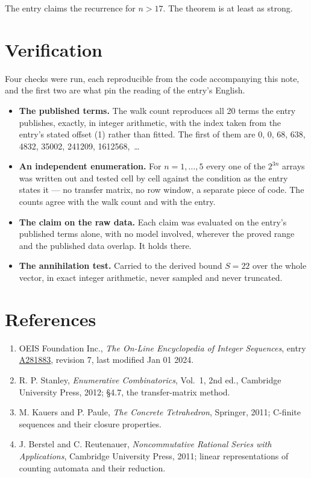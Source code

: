 \documentclass[11pt]{article}
\theoremstyle{definition}
\begin{document}
The entry claims the recurrence for $n > 17$. The theorem is at least as strong.

\section{Verification}

Four checks were run, each reproducible from the code accompanying this note, and the first two are what pin the reading of the entry's English.

\begin{itemize}

\item {\bfseries The published terms.} The walk count reproduces all 20 terms the entry publishes, exactly, in integer arithmetic, with the index taken from the entry's stated offset (1) rather than fitted. The first of them are 0, 0, 68, 638, 4832, 35002, 241209, 1612568,~\dots

\item {\bfseries An independent enumeration.} For $n = 1,\dots,5$ every one of the $2^{3n}$ arrays was written out and tested cell by cell against the condition as the entry states it --- no transfer matrix, no row window, a separate piece of code. The counts agree with the walk count and with the entry.

\item {\bfseries The claim on the raw data.} Each claim was evaluated on the entry's published terms alone, with no model involved, wherever the proved range and the published data overlap. It holds there.

\item {\bfseries The annihilation test.} Carried to the derived bound $S = 22$ over the whole vector, in exact integer arithmetic, never sampled and never truncated.

\end{itemize}

\section{References}

\begin{enumerate}

\item OEIS Foundation Inc., \emph{The On-Line Encyclopedia of Integer Sequences}, entry \href{https://oeis.org/A281883}{A281883}, revision 7, last modified Jan 01 2024.

\item R. P. Stanley, \emph{Enumerative Combinatorics}, Vol.~1, 2nd ed., Cambridge University Press, 2012; \S4.7, the transfer-matrix method.

\item M. Kauers and P. Paule, \emph{The Concrete Tetrahedron}, Springer, 2011; C-finite sequences and their closure properties.

\item J. Berstel and C. Reutenauer, \emph{Noncommutative Rational Series with Applications}, Cambridge University Press, 2011; linear representations of counting automata and their reduction.

\end{enumerate}
\end{document}
